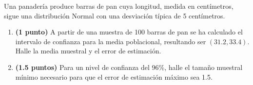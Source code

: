 
Una panadería produce barras de pan cuya longitud, medida en centímetros, sigue una distribución Normal con una desviación típica de 5 centímetros.
\begin{enumerate}[label=\alph*)]
\item \textbf{(1 punto)} A partir de una muestra de 100 barras de pan se ha calculado el intervalo de confianza para la media poblacional, resultando ser $(31.2,33.4)$. Halle la media muestral y el error de estimación.
\item \textbf{(1.5 puntos)} Para un nivel de confianza del 96\%, halle el tamaño muestral mínimo necesario para que el error de estimación máximo sea 1.5.
\end{enumerate}
